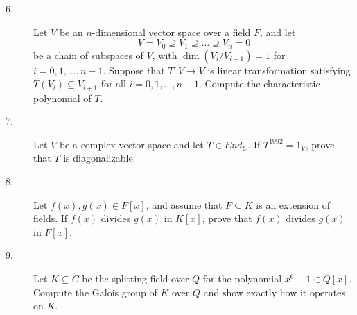 \documentclass{article}
\begin{document}
\begin{description}
\item[6.]
Let $V$ be an $n$-dimensional vector space over a field $F$, and let
$$V= V_0 \supseteq V_1 \supseteq \dots \supseteq V_n = 0$$
be a chain of subspaces of $V$, with $\dim(V_i/ V_{i+1}) = 1$ for
$i=0,1, \dots, n-1$. Suppose that $T:V \to V$ is linear transformation
satisfying $T(V_i) \subseteq V_{i+1}$ for all $i = 0,1, \dots, n-1$.
Compute the characteristic polynomial of $T$.

\item[7.]
Let $V$ be a complex vector space and let $T \in End_C$.
If $T^{1992} = 1_V$, prove that $T$ is diagonalizable.

\item[8.]
Let $f(x), g(x) \in F[x]$, and assume that $F \subseteq K$ is an extension of
fields. If $f(x)$ divides $g(x)$ in $K[x]$, prove that $f(x)$ divides
$g(x)$ in $F[x]$.

\item[9.]
Let $K \subseteq C$ be the splitting field over $Q$ for the polynomial
$x^6-1 \in Q[x]$. Compute the Galois group of $K$ over $Q$ and show
exactly how it operates on $K$.





\end{description}    
\end{document}
